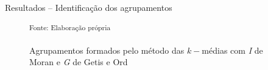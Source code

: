 \documentclass[aspectratio=169]{beamer}
\begin{document}
\begin{frame}{Resultados -- Identificação dos agrupamentos}
	\begin{figure}
		\centering
		\footnotesize
		\hspace{0.2cm}
	    \caption{Agrupamentos formados pelo método das $k-$médias com \textit{I} de Moran e \textit{G} de Getis e Ord}\label{cluster_kmedia}
	    \noindent \small \textsuperscript{Fonte: Elaboração própria}
	\end{figure}
\end{frame}
\end{document}
